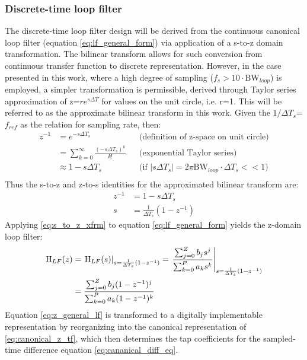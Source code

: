 \subsubsection{Discrete-time loop filter}\label{lf-discretization}
	The discrete-time loop filter design will be derived from the continuous canonical loop filter (equation \ref{eq:lf_general_form}) via application of a s-to-z domain transformation. The bilinear transform \cite{proakis_1993_bilinear} allows for such conversion from continuous transfer function to discrete representation. However, in the case presented in this work, where a high degree of sampling ($f_s > 10\cdot\mathrm{BW}_{loop}$) is employed, a simpler transformation is permissible, derived through Taylor series approximation of z=$re^{s\Delta T}$ for values on the unit circle, i.e. r=1. This will be referred to as the approximate bilinear transform in this work. Given the $1/\Delta T_s$=$f_{ref}$ as the relation for sampling rate, then:
	\begin{align*}
		z^{-1} &= e^{-s\Delta T_s} && \text{(definition of z-space on unit circle)} \\
		&= \sum_{k=0}^\infty\frac{(-s\Delta T_s)^k}{k!} && \text{(exponential Taylor series)} \\
		&\approx 1-s\Delta T_s &&\text{(if $|s\Delta T_s| = 2\pi\mathrm{BW}_{loop}\cdot \Delta T_s << 1$)} \\
	\end{align*}
	Thus the s-to-z and z-to-s identities for the approximated bilinear transform are:
	\begin{align}
		z^{-1} &= 1-s\Delta T_s\\
		s &= \frac{1}{\Delta T_s}(1-z^{-1}) \label{eq:s_to_z_xfrm}
	\end{align}
	Applying \ref{eq:s_to_z_xfrm} to equation \ref{eq:lf_general_form} yields the z-domain loop filter:
	\begin{align}
		\textnormal{H}_{LF}(z) &= \left.\textnormal{H}_{LF}(s)\right\vert_{s=\frac{1}{\Delta T_s}(1-z^{-1})} = \left.\frac{\sum_{j=0}^Z b_js^j}{\sum_{k=0}^P a_ks^k}\right\vert_{s=\frac{1}{\Delta T_s}(1-z^{-1})}\\
		&= \frac{\sum_{j=0}^Z b_j(1-z^{-1})^j}{\sum_{k=0}^P a_k(1-z^{-1})^k} \label{eq:z_general_lf}
	\end{align}
	Equation \ref{eq:z_general_lf} is transformed to a digitally implementable representation by reorganizing into the canonical representation of \ref{eq:canonical_z_tf}, which then determines the tap coefficients for the sampled-time difference equation \ref{eq:cananical_diff_eq}. 
